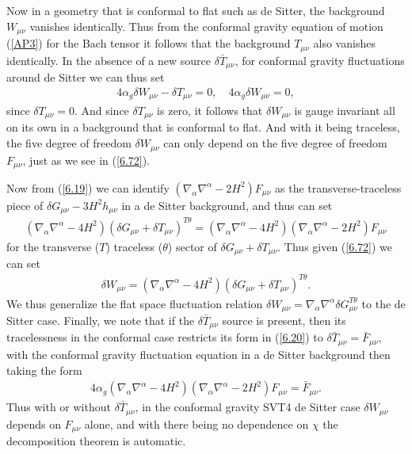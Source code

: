 Now in a geometry that is conformal to flat such as de Sitter, the background $W_{\mu\nu}$ vanishes identically. Thus from the conformal gravity equation of motion (\ref{AP3}) for the Bach tensor it follows that the background $T_{\mu\nu}$ also vanishes identically. In the absence of a new source $\delta \bar{T}_{\mu\nu}$, for conformal gravity fluctuations around de Sitter  we can thus set 
%
\begin{eqnarray}
4\alpha_g\delta W_{\mu\nu}-\delta T_{\mu\nu}=0,\quad 4\alpha_g\delta W_{\mu\nu}=0,
\label{6.73}
\end{eqnarray}
%
since $\delta T_{\mu\nu}=0$. And since $\delta T_{\mu\nu}$ is zero,  it follows that  $\delta W_{\mu\nu}$ is gauge invariant all on its own in a background that is conformal to flat. And with it being traceless, the five degree of freedom $\delta W_{\mu\nu}$ can only depend on the five degree of freedom $F_{\mu\nu}$, just as we see in (\ref{6.72}). 

Now from  (\ref{6.19}) we can identify $(\nabla_{\alpha}\nabla^{\alpha}-2H^2)F_{\mu\nu}$ as the transverse-traceless piece of $\delta G_{\mu\nu}-3H^2h_{\mu\nu}$ in a de Sitter background, and thus can set 
%
\begin{eqnarray}
(\nabla_{\alpha}\nabla^{\alpha}-4H^2)(\delta G_{\mu\nu}+\delta T_{\mu\nu})^{T\theta}=(\nabla_{\alpha}\nabla^{\alpha}-4H^2)(\nabla_{\alpha}\nabla^{\alpha}-2H^2)F_{\mu\nu}
\label{6.74}
\end{eqnarray}
%
for the transverse ($T$) traceless ($\theta$) sector of $\delta G_{\mu\nu}+\delta T_{\mu\nu}$. Thus given (\ref{6.72}) we can set
%
\begin{eqnarray}
\delta W_{\mu\nu}=(\nabla_{\alpha}\nabla^{\alpha}-4H^2)(\delta G_{\mu\nu}+\delta T_{\mu\nu})^{T\theta}.
\label{6.75}
\end{eqnarray}
%
We thus generalize the flat space fluctuation relation $\delta W_{\mu\nu}=\nabla_{\alpha}\nabla^{\alpha}\delta G_{\mu\nu}^{T\theta}$ to the de Sitter case. Finally, we note that if the  $\delta\bar{T}_{\mu\nu}$ source is present, then its tracelessness in the conformal case restricts its form in (\ref{6.20}) to $\delta \bar{T}_{\mu\nu}=\bar{F}_{\mu\nu}$, with the conformal gravity fluctuation equation in a de Sitter background then taking the form 
%
\begin{eqnarray}
4\alpha_g(\nabla_{\alpha}\nabla^{\alpha}-4H^2)(\nabla_{\alpha}\nabla^{\alpha}-2H^2)F_{\mu\nu}=\bar{F}_{\mu\nu}.
\label{6.76}
\end{eqnarray}
%
Thus with or without $\delta \bar{T}_{\mu\nu}$, in the conformal gravity SVT4 de Sitter case $\delta W_{\mu\nu}$ depends on $F_{\mu\nu}$ alone, and with there being no dependence on $\chi$ the decomposition theorem is automatic. 
